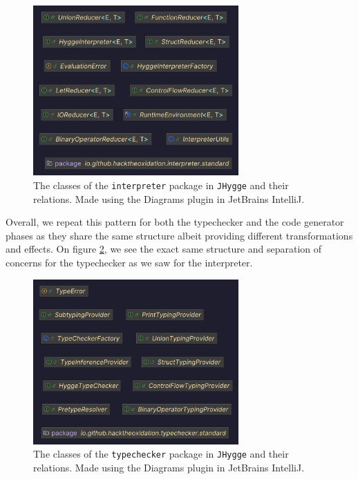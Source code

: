 \begin{figure}[H]
\centering
\includegraphics[width=0.7\textwidth]{Pictures/Diagrams/interpreter_classes.png}
\caption{The classes of the \texttt{interpreter} package in \texttt{JHygge} and their relations. Made using the Diagrams plugin in JetBrains IntelliJ.}
\label{fig:interpreter_classes}
\end{figure}

Overall, we repeat this pattern for both the typechecker and the code generator phases as they share the same structure albeit providing different
transformations and effects. On figure \ref{fig:typechecker_classes}, we see the exact same structure and separation of concerns for the typechecker as we saw for the interpreter. 

\begin{figure}[H]
\centering
\includegraphics[width=0.7\textwidth]{Pictures/Diagrams/typechecker_classes.png}
\caption{The classes of the \texttt{typechecker} package in \texttt{JHygge} and their relations. Made using the Diagrams plugin in JetBrains IntelliJ.}
\label{fig:typechecker_classes}
\end{figure}

